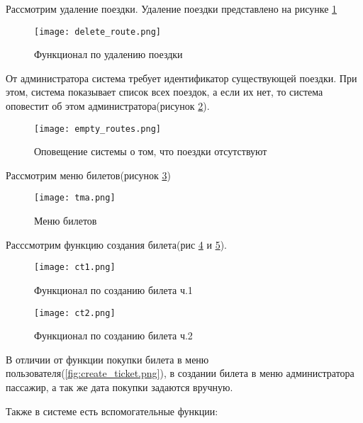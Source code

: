 Рассмотрим удаление поездки. Удаление поездки представлено на рисунке \ref{fig:delete_route}

\begin{figure}[H]
    \centering
    \texttt{[image: delete\_route.png]}
    \caption{Функционал по удалению поездки}
    \label{fig:delete_route}
\end{figure}

От администратора система требует идентификатор существующей поездки. При этом, система показывает список всех поездок, а если их нет, то система оповестит об этом администратора(рисунок \ref{fig:empty_routes}). 

\begin{figure}[H]
    \centering
    \texttt{[image: empty\_routes.png]}
    \caption{Оповещение системы о том, что поездки отсутствуют}
    \label{fig:empty_routes}
\end{figure}

Рассмотрим меню билетов(рисунок \ref{fig:tma})

\begin{figure}[H]
    \centering
    \texttt{[image: tma.png]}
    \caption{Меню билетов}
    \label{fig:tma}
\end{figure}

Расссмотрим функцию создания билета(рис \ref{fig:ct1} и \ref{fig:ct2}).

\begin{figure}[H]
    \centering
    \texttt{[image: ct1.png]}
    \caption{Функционал по созданию билета ч.1}
    \label{fig:ct1}
\end{figure}

\begin{figure}[H]
    \centering
    \texttt{[image: ct2.png]}
    \caption{Функционал по созданию билета ч.2}
    \label{fig:ct2}
\end{figure}

В отличии от функции покупки билета в меню пользователя(\ref{fig:create_ticket.png}), в создании билета в меню администратора пассажир, а так же дата покупки задаются вручную.

Также в системе есть вспомогательные функции:

